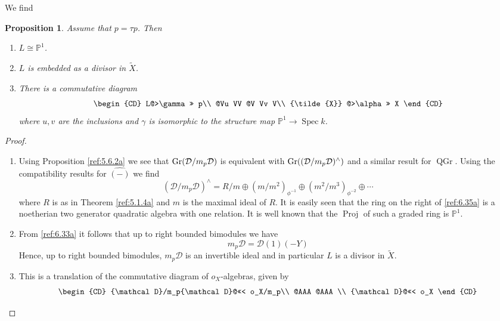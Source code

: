 \documentclass{amsproc}
\def \PP{{\mathbb P}}
\def\Dscr{{\mathcal D}}
\def\Gr{\mathop{\text{Gr}}}
\def\spec{\operatorname {Spec}}
\def\Proj{\operatorname {Proj}}
\def\r{\rightarrow}
\let\oldtext\text
\def\text#1{\oldtext{\upshape #1}}
\DeclareMathOperator{\QGr}{QGr}
\newtheorem{propositions}[lemmas]{Proposition}
\theoremstyle{definition}
\theoremstyle{remark}
\numberwithin{equation}{section}
\numberwithin{table}{section}
\numberwithin{figure}{section}
\def\Gr{\mathop{\text{Gr}}}
\begin{document}
 We find
\begin{propositions} 
\label{ref:6.6.2a}
Assume that $p=\tau p$. Then
\begin{enumerate}
\item
$L\cong \PP^1$.
\item $L$ is embedded as a divisor in ${\tilde{X}}$.
\item There is a commutative diagram
\begin{equation}
\label{ref:6.34a}
\begin{CD}
L@>\gamma>> p\\
@Vu VV @V Vv V\\
{\tilde{X}} @>\alpha>> X
\end{CD}
\end{equation}
where $u,v$ are the inclusions and $\gamma$ is isomorphic to
the structure map $\PP^1\r \spec k$. 
\end{enumerate}
\end{propositions}
\begin{proof}
\begin{enumerate}
\item 
 Using Proposition
\ref{ref:5.6.2a} we see that $\Gr(\Dscr/m_p\Dscr)$ is
equivalent with $\Gr((\Dscr/m_p\Dscr)^\wedge)$ and a similar
result for $\QGr$. Using the
compatibility results for $\hat{(-)}$ we find 
\begin{equation}
\label{ref:6.35a}
(\Dscr/m_p\Dscr)^\wedge=R/m\oplus
(m/m^2)_{\phi^{-1}}\oplus(m^2/m^3)_{\phi^{-2}}\oplus\cdots
\end{equation} where $R$ is as in  Theorem \ref{ref:5.1.4a} and
$m$ is the maximal ideal of $R$. It is easily seen that the ring on
the right of \eqref{ref:6.35a} is a noetherian two generator quadratic
algebra with one relation.
It is well known that  the $\Proj$ of such a graded ring is $\PP^1$. 
\item From \eqref{ref:6.33a} it follows that 
up to
right bounded bimodules we have
\[
m_p\Dscr=\Dscr(1)(-Y)
\]
Hence, up to right bounded bimodules, $m_p\Dscr$ is an invertible
ideal and in particular $L$ is a divisor in $\tilde{X}$.
\item
This is a translation of the commutative diagram of $o_X$-algebras, given
by
\[
\begin{CD}
\Dscr/m_p\Dscr @<<< o_X/m_p\\
@AAA @AAA \\
\Dscr @<<< o_X
\end{CD}\qed
\]
\end{enumerate}
\def\qed{}\end{proof}
\end{document}
